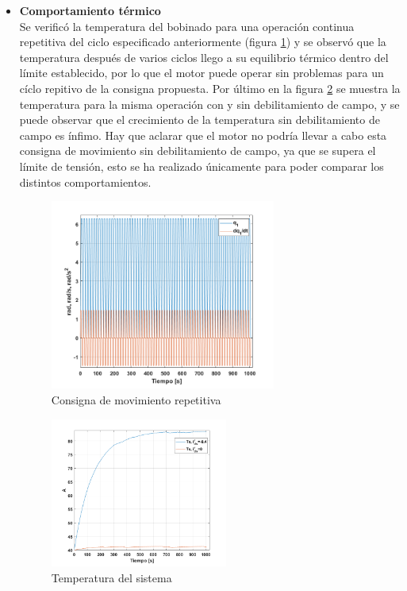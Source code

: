 \documentclass[10pt]{article}
\begin{document}
\begin{itemize}
\item \textbf{Comportamiento térmico}\\
Se verificó la temperatura del bobinado para una operación continua repetitiva del ciclo especificado anteriormente (figura \ref{fig:rep}) y se observó que la temperatura después de varios ciclos llego a su equilibrio térmico dentro del límite establecido, por lo que el motor puede operar sin problemas para un cíclo repitivo de la consigna propuesta. Por último en la figura \ref{fig:temp} se muestra la temperatura para la misma operación con y sin debilitamiento de campo, y se puede observar que el crecimiento de la temperatura
 sin debilitamiento de campo es ínfimo. Hay que aclarar que el motor no podría llevar a cabo esta consigna de movimiento sin debilitamiento de campo, ya que se supera el límite de tensión,
  esto se ha realizado únicamente para poder comparar los distintos comportamientos.
  \begin{figure}[h!]
	\centering
	\includegraphics[width=0.7\textwidth]{rep.png}
	\caption{\label{fig:rep}Consigna de movimiento repetitiva}
	\end{figure}
	\begin{figure}[h!]
		\centering
		\includegraphics[width=0.55\textwidth]{temp.png}
		\caption{\label{fig:temp}Temperatura del sistema}
		\end{figure}


\end{itemize}
\end{document}
